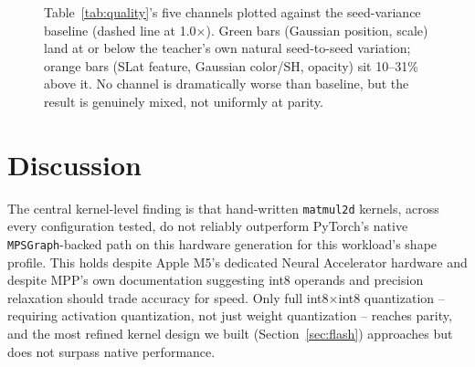 \documentclass[11pt]{article}
\newcommand{\code}[1]{\texttt{#1}}
\begin{document}
\begin{figure}[t]
    \centering
    \caption{Table~\ref{tab:quality}'s five channels plotted against the seed-variance baseline
    (dashed line at 1.0$\times$). Green bars (Gaussian position, scale) land at or below the
    teacher's own natural seed-to-seed variation; orange bars (SLat feature, Gaussian color/SH,
    opacity) sit 10--31\% above it. No channel is dramatically worse than baseline, but the result
    is genuinely mixed, not uniformly at parity.}
    \label{fig:quality-bars}
\end{figure}

\section{Discussion}

The central kernel-level finding is that hand-written \code{matmul2d} kernels, across every
configuration tested, do not reliably outperform PyTorch's native \code{MPSGraph}-backed path on
this hardware generation for this workload's shape profile. This holds despite Apple M5's
dedicated Neural Accelerator hardware and despite MPP's own documentation suggesting int8
operands and precision relaxation should trade accuracy for speed. Only full int8$\times$int8
quantization -- requiring activation quantization, not just weight quantization -- reaches parity,
and the most refined kernel design we built (Section~\ref{sec:flash}) approaches but does not
surpass native performance.
\end{document}
